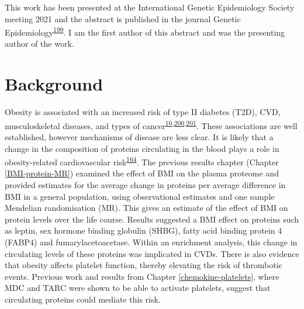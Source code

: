 \documentclass[11pt,twoside]{bristolthesis}
\begin{document}
This work has been presented at the International Genetic Epidemiology Society meeting 2021 and the abstract is published in the journal Genetic Epidemiology\textsuperscript{\protect\hyperlink{ref-IGES2021}{199}}. I am the first author of this abstract and was the presenting author of the work.

\hypertarget{background-4}{%
\section{Background}\label{background-4}}

Obesity is associated with an increased risk of type II diabetes (T2D), CVD, musculoskeletal diseases, and types of cancer\textsuperscript{\protect\hyperlink{ref-Khan2018}{10},\protect\hyperlink{ref-Garg2014}{200},\protect\hyperlink{ref-Kortt2002}{201}}. These associations are well established, however mechanisms of disease are less clear. It is likely that a change in the composition of proteins circulating in the blood plays a role in obesity-related cardiovascular risk\textsuperscript{\protect\hyperlink{ref-Goudswaard2021}{164}}. The previous results chapter (Chapter \ref{BMI-protein-MR}) examined the effect of BMI on the plasma proteome and provided estimates for the average change in proteins per average difference in BMI in a general population, using observational estimates and one sample Mendelian randomisation (MR). This gives an estimate of the effect of BMI on protein levels over the life course. Results suggested a BMI effect on proteins such as leptin, sex hormone binding globulin (SHBG), fatty acid binding protein 4 (FABP4) and fumarylacetoacetase. Within an enrichment analysis, this change in circulating levels of these proteins was implicated in CVDs. There is also evidence that obesity affects platelet function, thereby elevating the risk of thrombotic events. Previous work and results from Chapter \ref{chemokine-platelets}, where MDC and TARC were shown to be able to activate platelets, suggest that circulating proteins could mediate this risk.
\end{document}
